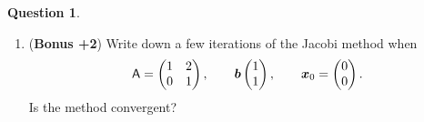 \documentclass[11pt]{article}
\theoremstyle{definition}
\newtheorem{question}{Question}
\begin{document}
\begin{question}
\begin{enumerate}
        \item
            (\textbf{Bonus +2})
            Write down a few iterations of the Jacobi method when
            \[
                \mathsf A =
                \begin{pmatrix}
                    1 & 2 \\
                    0 & 1
                \end{pmatrix},
                \qquad
                \mathbf{\boldsymbol{b}}
                \begin{pmatrix}
                    1 \\
                    1
                \end{pmatrix},
                \qquad
                \mathbf{\boldsymbol{x}}_0 =
                \begin{pmatrix}
                    0 \\
                    0
                \end{pmatrix}.
            \]
            Is the method convergent?
    \end{enumerate}
\end{question}
\end{document}
